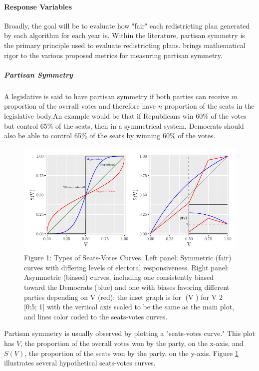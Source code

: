 \paragraph{Response Variables}

Broadly, the goal will be to evaluate how "fair" each redistricting plan generated by each algorithm for each year is. Within the literature, partisan symmetry is the primary principle used to evaluate redistricting plans. \textcite{katz2020} brings mathematical rigor to the various proposed metrics for measuring partisan symmetry. 

\subparagraph{Partisan Symmetry}

A legislative is said to have partisan symmetry if both parties can receive $m$ proportion of the overall votes and therefore have $n$ proportion of the seats in the legislative body.An example would be that if Republicans win 60\% of the votes but control 65\% of the seats, then in a symmetrical system, Democrats should also be able to control 65\% of the seats by winning 60\% of the votes. \textcite{katz2020}

\begin{figure}
    \includegraphics[width=\linewidth]{method/seatsvotes.png}
    \caption{Figure 1: Types of Seats-Votes Curves. Left panel: Symmetric (fair) curves with differing
    levels of electoral responsiveness. Right panel: Asymmetric (biased) curves, including
    one consistently biased toward the Democrats (blue) and one with biases favoring different
    parties depending on V (red); the inset graph is for (V ) for V 2 [0:5; 1] with the vertical
    axis scaled to be the same as the main plot, and lines color coded to the seats-votes curves. \parencite[175]{katz2020}}
    \label{fig:seatsvotes1}
\end{figure}

Partisan symmetry is usually observed by plotting a "seats-votes curve." This plot has $V$, the proportion of the overall votes won by the party, on the x-axis, and $S(V)$, the proportion of the seats won by the party, on the y-axis. Figure \ref{fig:seatsvotes1} \parencite[175]{katz2020} illustrates several hypothetical seats-votes curves.


